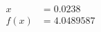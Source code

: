 \documentclass[preview]{standalone}
\begin{document}
\begin{align*}
x &= 0.0238\\f(x) &= 4.0489587
\end{align*}
\end{document}
